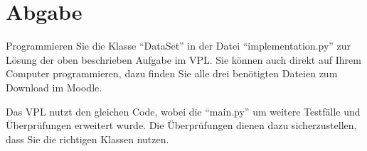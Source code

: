\documentclass[a4paper,11pt]{article}
\begin{document}
\section{Abgabe}

Programmieren Sie die Klasse ``DataSet'' in der Datei ``implementation.py'' zur Lösung der oben beschrieben Aufgabe im VPL.
Sie können auch direkt auf Ihrem Computer programmieren, dazu finden Sie alle drei benötigten Dateien zum Download im Moodle.

Das VPL nutzt den gleichen Code, wobei die ``main.py'' um weitere Testfälle und Überprüfungen erweitert wurde.
Die Überprüfungen dienen dazu sicherzustellen, dass Sie die richtigen Klassen nutzen.
\end{document}
